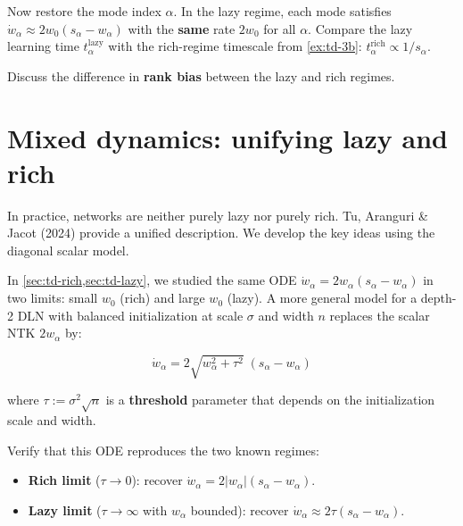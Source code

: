 \documentclass[11pt]{article}
\providecommand{\tightlist}{%
  \setlength{\itemsep}{0pt}\setlength{\parskip}{0pt}}
\begin{document}
\begin{exercise}
\label{ex:td-4c}
Now restore the mode
index \(\alpha\). In the lazy regime, each mode satisfies
\(\dot{w}_\alpha \approx 2w_0(s_\alpha - w_\alpha)\) with the
\textbf{same} rate \(2w_0\) for all \(\alpha\). Compare the lazy
learning time \(t_\alpha^{\text{lazy}}\) with the rich-regime timescale
from \cref{ex:td-3b}: \(t_\alpha^{\text{rich}} \propto 1/s_\alpha\).

Discuss the difference in \textbf{rank bias} between the lazy and rich
regimes.
\end{exercise}


\section{Mixed dynamics: unifying lazy and rich}
\label{sec:td-mixed}

In practice, networks are neither purely lazy nor purely rich. Tu,
Aranguri \& Jacot (2024) provide a unified description. We develop the
key ideas using the diagonal scalar model.

\begin{exercise}
\label{ex:td-5a}
In \cref{sec:td-rich,sec:td-lazy}, we
studied the same ODE \(\dot{w}_\alpha = 2w_\alpha(s_\alpha - w_\alpha)\)
in two limits: small \(w_0\) (rich) and large \(w_0\) (lazy). A more
general model for a depth-2 DLN with balanced initialization at scale
\(\sigma\) and width \(n\) replaces the scalar NTK \(2w_\alpha\) by:

\[\dot{w}_\alpha = 2\sqrt{w_\alpha^2 + \tau^2}\;(s_\alpha - w_\alpha)\]

where \(\tau := \sigma^2 \sqrt{n}\) is a \textbf{threshold} parameter
that depends on the initialization scale and width.

Verify that this ODE reproduces the two known regimes:

\begin{itemize}
\tightlist
\item
  \textbf{Rich limit} (\(\tau \to 0\)): recover
  \(\dot{w}_\alpha = 2|w_\alpha|(s_\alpha - w_\alpha)\).
\item
  \textbf{Lazy limit} (\(\tau \to \infty\) with \(w_\alpha\) bounded):
  recover \(\dot{w}_\alpha \approx 2\tau(s_\alpha - w_\alpha)\).
\end{itemize}
\end{exercise}
\end{document}
